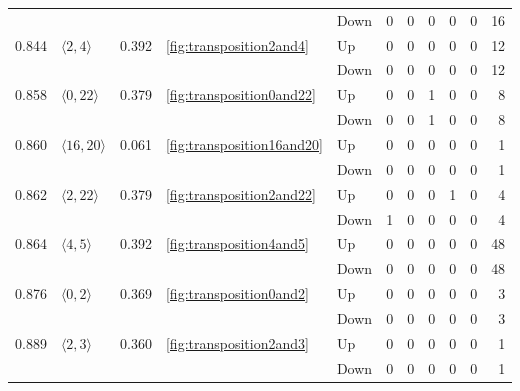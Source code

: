 \documentclass{article}
\begin{document}
\begin{center}
\begin{tabular}{lllllrrrrrr}
 &  &  &  & Down & 0 & 0 & 0 & 0 & 0 & 16 \\
\cline{1-11} \cline{2-11} \cline{3-11} \cline{4-11}
\multirow[t]{2}{*}{0.844} & \multirow[t]{2}{*}{$\langle2, 4\rangle$} & \multirow[t]{2}{*}{0.392} & \multirow[t]{2}{*}{\ref{fig:transposition2and4}} & Up & 0 & 0 & 0 & 0 & 0 & 12 \\
 &  &  &  & Down & 0 & 0 & 0 & 0 & 0 & 12 \\
\cline{1-11} \cline{2-11} \cline{3-11} \cline{4-11}
\multirow[t]{2}{*}{0.858} & \multirow[t]{2}{*}{$\langle0, 22\rangle$} & \multirow[t]{2}{*}{0.379} & \multirow[t]{2}{*}{\ref{fig:transposition0and22}} & Up & 0 & 0 & 1 & 0 & 0 & 8 \\
 &  &  &  & Down & 0 & 0 & 1 & 0 & 0 & 8 \\
\cline{1-11} \cline{2-11} \cline{3-11} \cline{4-11}
\multirow[t]{2}{*}{0.860} & \multirow[t]{2}{*}{$\langle16, 20\rangle$} & \multirow[t]{2}{*}{0.061} & \multirow[t]{2}{*}{\ref{fig:transposition16and20}} & Up & 0 & 0 & 0 & 0 & 0 & 1 \\
 &  &  &  & Down & 0 & 0 & 0 & 0 & 0 & 1 \\
\cline{1-11} \cline{2-11} \cline{3-11} \cline{4-11}
\multirow[t]{2}{*}{0.862} & \multirow[t]{2}{*}{$\langle2, 22\rangle$} & \multirow[t]{2}{*}{0.379} & \multirow[t]{2}{*}{\ref{fig:transposition2and22}} & Up & 0 & 0 & 0 & 1 & 0 & 4 \\
 &  &  &  & Down & 1 & 0 & 0 & 0 & 0 & 4 \\
\cline{1-11} \cline{2-11} \cline{3-11} \cline{4-11}
\multirow[t]{2}{*}{0.864} & \multirow[t]{2}{*}{$\langle4, 5\rangle$} & \multirow[t]{2}{*}{0.392} & \multirow[t]{2}{*}{\ref{fig:transposition4and5}} & Up & 0 & 0 & 0 & 0 & 0 & 48 \\
 &  &  &  & Down & 0 & 0 & 0 & 0 & 0 & 48 \\
\cline{1-11} \cline{2-11} \cline{3-11} \cline{4-11}
\multirow[t]{2}{*}{0.876} & \multirow[t]{2}{*}{$\langle0, 2\rangle$} & \multirow[t]{2}{*}{0.369} & \multirow[t]{2}{*}{\ref{fig:transposition0and2}} & Up & 0 & 0 & 0 & 0 & 0 & 3 \\
 &  &  &  & Down & 0 & 0 & 0 & 0 & 0 & 3 \\
\cline{1-11} \cline{2-11} \cline{3-11} \cline{4-11}
\multirow[t]{2}{*}{0.889} & \multirow[t]{2}{*}{$\langle2, 3\rangle$} & \multirow[t]{2}{*}{0.360} & \multirow[t]{2}{*}{\ref{fig:transposition2and3}} & Up & 0 & 0 & 0 & 0 & 0 & 1 \\
 &  &  &  & Down & 0 & 0 & 0 & 0 & 0 & 1 \\
\cline{1-11} \cline{2-11} \cline{3-11} \cline{4-11}

\end{tabular}
\end{center}
\end{document}
